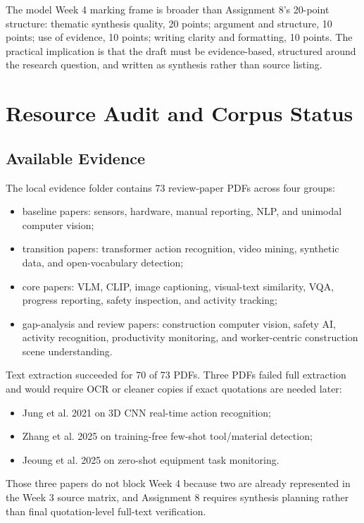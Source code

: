 \documentclass[10pt,letterpaper]{article}
\begin{document}
The model Week 4 marking frame is broader than Assignment 8's 20-point structure: thematic synthesis quality, 20 points; argument and structure, 10 points; use of evidence, 10 points; writing clarity and formatting, 10 points. The practical implication is that the draft must be evidence-based, structured around the research question, and written as synthesis rather than source listing.

\section{Resource Audit and Corpus Status}

\subsection{Available Evidence}

The local evidence folder contains 73 review-paper PDFs across four groups:

\begin{itemize}
\item baseline papers: sensors, hardware, manual reporting, NLP, and unimodal computer vision;
\item transition papers: transformer action recognition, video mining, synthetic data, and open-vocabulary detection;
\item core papers: VLM, CLIP, image captioning, visual-text similarity, VQA, progress reporting, safety inspection, and activity tracking;
\item gap-analysis and review papers: construction computer vision, safety AI, activity recognition, productivity monitoring, and worker-centric construction scene understanding.
\end{itemize}

Text extraction succeeded for 70 of 73 PDFs. Three PDFs failed full extraction and would require OCR or cleaner copies if exact quotations are needed later:

\begin{itemize}
\item Jung et al. 2021 on 3D CNN real-time action recognition;
\item Zhang et al. 2025 on training-free few-shot tool/material detection;
\item Jeoung et al. 2025 on zero-shot equipment task monitoring.
\end{itemize}

Those three papers do not block Week 4 because two are already represented in the Week 3 source matrix, and Assignment 8 requires synthesis planning rather than final quotation-level full-text verification.
\end{document}
